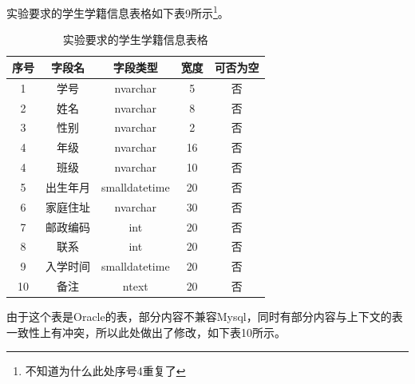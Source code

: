 \documentclass[a4paper,UTF8,heading=false,12pt]{article}
\begin{document}
    实验要求的学生学籍信息表格如下表9所示\footnote{不知道为什么此处序号4重复了}。

    \begin{table}[htbp]
        \begin{center}
            \begin{tabular}{@{}ccccc@{}}
            \toprule
            序号 & 字段名  & 字段类型     & 宽度 & 可否为空 \\ \midrule
            1  & 学号   & nvarchar & 5 & 否    \\
            2  & 姓名   & nvarchar & 8 & 否    \\
            3  & 性别   & nvarchar & 2 & 否    \\
            4  & 年级   & nvarchar & 16 & 否    \\
            4  & 班级   & nvarchar & 10 & 否    \\
            5  & 出生年月   & smalldatetime & 20 & 否    \\
            6  & 家庭住址   & nvarchar & 30 & 否    \\
            7  & 邮政编码   & int & 20 & 否    \\
            8  & 联系   & int & 20 & 否    \\
            9  & 入学时间   & smalldatetime & 20 & 否    \\
            10  & 备注   & ntext & 20 & 否    \\
            \bottomrule
            \end{tabular}
            \caption{实验要求的学生学籍信息表格}
        \end{center}
    \end{table}

    由于这个表是Oracle的表，部分内容不兼容Mysql，同时有部分内容与上下文的表一致性上有冲突，所以此处做出了修改，如下表10所示。
\end{document}
